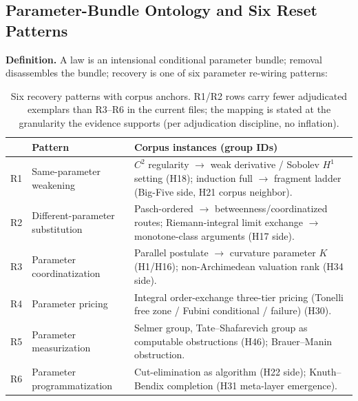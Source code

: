 
\subsection{Parameter-Bundle Ontology and Six Reset Patterns}\label{sec:act2-rpatterns}

\textbf{Definition.} A law is an intensional conditional parameter
bundle; removal disassembles the bundle; recovery is one of six
parameter re-wiring patterns:

\begin{table}[h]
\centering
\begin{tabular}{llp{}}
\toprule
 & \textbf{Pattern} & \textbf{Corpus instances (group IDs)} \\
\midrule
R1 & Same-parameter weakening & $C^2$ regularity $\to$ weak
derivative / Sobolev $H^1$ setting (H18); induction full $\to$
fragment ladder (Big-Five side, H21 corpus neighbor). \\
R2 & Different-parameter substitution & Pasch-ordered $\to$
betweenness/coordinatized routes; Riemann-integral limit exchange
$\to$ monotone-class arguments (H17 side). \\
R3 & Parameter coordinatization & Parallel postulate $\to$ curvature
parameter $K$ (H1/H16); non-Archimedean valuation rank (H34 side). \\
R4 & Parameter pricing & Integral order-exchange three-tier pricing
(Tonelli free zone / Fubini conditional / failure) (H30). \\
R5 & Parameter measurization & Selmer group, Tate--Shafarevich group
as computable obstructions (H46); Brauer--Manin obstruction. \\
R6 & Parameter programmatization & Cut-elimination as algorithm
(H22 side); Knuth--Bendix completion (H31 meta-layer emergence). \\
\bottomrule
\end{tabular}
\caption{Six recovery patterns with corpus anchors. R1/R2 rows carry
fewer adjudicated exemplars than R3--R6 in the current files; the
mapping is stated at the granularity the evidence supports (per
adjudication discipline, no inflation).}
\end{table}

